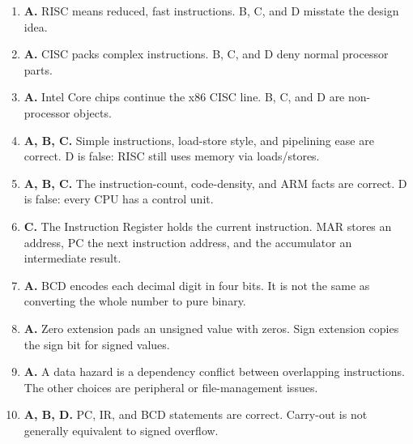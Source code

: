 \begin{enumerate}[label=\textbf{Q\arabic*.}, leftmargin=*]
\item \textbf{A.} RISC means reduced, fast instructions. B, C, and D misstate the design idea.
\item \textbf{A.} CISC packs complex instructions. B, C, and D deny normal processor parts.
\item \textbf{A.} Intel Core chips continue the x86 CISC line. B, C, and D are non-processor objects.
\item \textbf{A, B, C.} Simple instructions, load-store style, and pipelining ease are correct. D is false: RISC still uses memory via loads/stores.
\item \textbf{A, B, C.} The instruction-count, code-density, and ARM facts are correct. D is false: every CPU has a control unit.
\item \textbf{C.} The Instruction Register holds the current instruction. MAR stores an address, PC the next instruction address, and the accumulator an intermediate result.

\item \textbf{A.} BCD encodes each decimal digit in four bits. It is not the same as converting the whole number to pure binary.

\item \textbf{A.} Zero extension pads an unsigned value with zeros. Sign extension copies the sign bit for signed values.

\item \textbf{A.} A data hazard is a dependency conflict between overlapping instructions. The other choices are peripheral or file-management issues.

\item \textbf{A, B, D.} PC, IR, and BCD statements are correct. Carry-out is not generally equivalent to signed overflow.

\end{enumerate}

